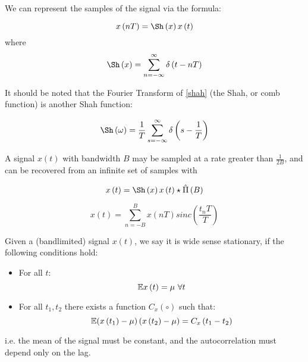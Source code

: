 We can represent the samples of the signal via the formula:

\begin{equation}
x\left(nT\right) = \Sh\left(x\right)x\left(t\right)
\end{equation}
%
where
%
\begin{equation}
\Sh\left(x\right) = \sum_{n=-\infty}^{\infty} \delta\left(t - nT\right)
\end{equation}
\label{shah}

It should be noted that the Fourier Transform of \eqref{shah} (the Shah, or comb function) is another Shah function:

\begin{equation}
\Sh\left(\omega\right) = \frac{1}{T}\sum_{s=-\infty}^{\infty} \delta\left(s - \frac{1}{T}\right)
\end{equation}


\begin{theorem}
A signal \(x\left(t\right)\) with bandwidth \(B\) may be sampled at a rate greater than \(\frac{1}{2B}\), and can be recovered from an infinite set of samples with

\begin{equation}
x\left(t\right) = \Sh\left(x\right) x\left(t\right) \star \hat{\Pi}\left(B\right)
\end{equation}

\begin{equation}
x\left(t\right) = \sum_{n=-B}^B x\left(nT\right) sinc\left(\frac{t_nT}{T}\right)
\end{equation}

\end{theorem}

\begin{definition}
Given a (bandlimited) signal \(x\left(t\right)\), we say it is wide sense stationary, if the following conditions hold:

\begin{itemize}
\item
For all \(t\):
\begin{equation}
{\mathbb{E}}{x\left(t\right)} = \mu \text{ } \forall t
\end{equation}
\item 
For all \(t_1, t_2\) there exists a function \(C_x(\circ)\) such that:
\begin{equation}
{\mathbb{E}}{\left(x\left(t_1\right) - \mu\right)\left(x\left(t_2\right) - \mu\right)} = C_{x}\left(t_1 - t_2 \right) 
\end{equation}
\end{itemize}
i.e. the mean of the signal must be constant, and the autocorrelation must depend only on the lag.
\end{definition}

